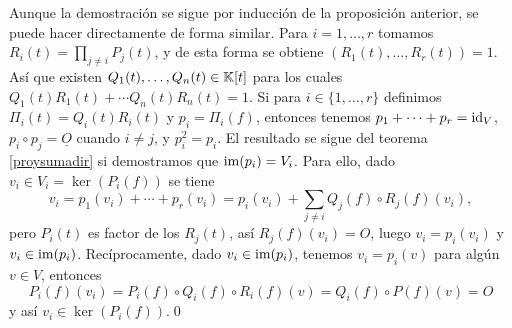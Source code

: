 \dem Aunque la demostración se sigue por inducción de la proposición anterior, se puede hacer directamente de forma similar. Para $i=1,\ldots,r$ tomamos $R_i(t)=\prod_{j\ne i}P_j(t)$, y de esta forma se obtiene $(R_1(t),\ldots,R_r(t))=1$. Así que existen $Q_1(t),\ldots, Q_n(t)\in \mathbb{K}[t]$ para los cuales $Q_1(t)R_1(t)+\cdots Q_n(t)R_n(t)=1$. Si para $i\in\{1,\ldots,r\}$ definimos $\Pi_i(t)=Q_i(t)R_i(t)$ y $p_i=\Pi_i(f)$, entonces tenemos $p_1+\cdots+p_r=\operatorname{id}_V$,
$p_i\circ p_j=\underline{O}$ cuando $i\ne j$, y $p_i^2=p_i$. El resultado se sigue del teorema \ref{proysumadir} si demostramos que $\operatorname{im}(p_i)=V_i$. Para ello, dado $v_i\in V_i=\ker(P_i(f))$ se tiene
$$v_i=p_1(v_i)+\cdots+p_r(v_i)=p_i(v_i)+\sum_{j\ne i} Q_j(f)\circ R_j(f)(v_i),$$
pero $P_i(t)$ es factor de los $R_j(t)$, así $R_j(f)(v_i)=O$, luego $v_i=p_i(v_i)$ y $v_i\in\operatorname{im}(p_i)$. Recíprocamente, dado $v_i\in\operatorname{im}(p_i)$, tenemos $v_i=p_i(v)$ para algún $v\in V$, entonces 
$$P_i(f)(v_i)=P_i(f)\circ Q_i(f)\circ R_i(f)(v)=Q_i(f)\circ P(f)(v)=O$$
y así $v_i\in\ker(P_i(f))$.\qed


